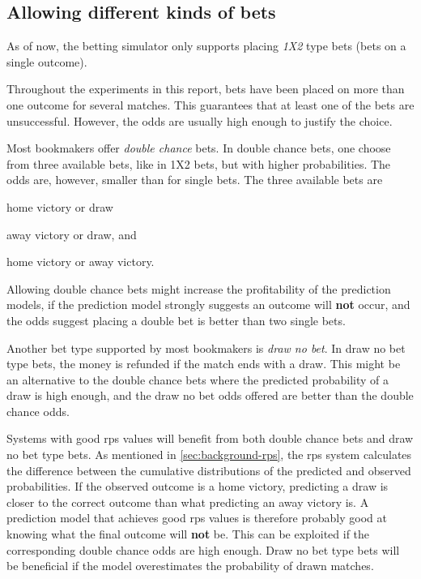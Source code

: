 \subsection{Allowing different kinds of bets}

As of now, the betting simulator only supports placing \textit{1X2} type bets (bets on a single outcome).

Throughout the experiments in this report, bets have been placed on more than one outcome for several matches. This guarantees that at least one of the bets are unsuccessful. However, the odds are usually high enough to justify the choice.

Most bookmakers offer \textit{double chance} bets. In double chance bets, one choose from three available bets, like in 1X2 bets, but with higher probabilities. The odds are, however, smaller than for single bets. The three available bets are
\begin{enumerate*}[label={\alph*)}]
    \item home victory or draw
    \item away victory or draw, and
    \item home victory or away victory.
\end{enumerate*}
Allowing double chance bets might increase the profitability of the prediction models, if the prediction model strongly suggests an outcome will \textbf{not} occur, and the odds suggest placing a double bet is better than two single bets.

Another bet type supported by most bookmakers is \textit{draw no bet}. In draw no bet type bets, the money is refunded if the match ends with a draw. This might be an alternative to the double chance bets where the predicted probability of a draw is high enough, and the draw no bet odds offered are better than the double chance odds.

Systems with good \gls{rps} values will benefit from both double chance bets and draw no bet type bets. As mentioned in \cref{sec:background-rps}, the \gls{rps} system calculates the difference between the cumulative distributions of the predicted and observed probabilities. If the observed outcome is a home victory, predicting a draw is closer to the correct outcome than what predicting an away victory is. A prediction model that achieves good \gls{rps} values is therefore probably good at knowing what the final outcome will \textbf{not} be. This can be exploited if the corresponding double chance odds are high enough. Draw no bet type bets will be beneficial if the model overestimates the probability of drawn matches.